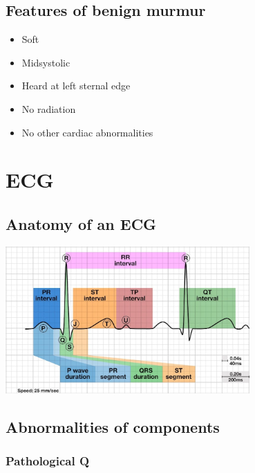 \documentclass[
  12pt,
]{memoir}
\providecommand{\tightlist}{%
  \setlength{\itemsep}{0pt}\setlength{\parskip}{0pt}}
\begin{document}
\hypertarget{features-of-benign-murmur}{%
\subsection{Features of benign murmur}\label{features-of-benign-murmur}}

\begin{itemize}
\tightlist
\item
  Soft
\item
  Midsystolic
\item
  Heard at left sternal edge
\item
  No radiation
\item
  No other cardiac abnormalities
\end{itemize}

\hypertarget{ecg}{%
\section{ECG}\label{ecg}}

\hypertarget{anatomy-of-an-ecg}{%
\subsection{Anatomy of an ECG}\label{anatomy-of-an-ecg}}

\includegraphics[width=0.7\textwidth]{../assets/med/ecg-anatomy.jpg}

\hypertarget{abnormalities-of-components}{%
\subsection{Abnormalities of
components}\label{abnormalities-of-components}}

\hypertarget{pathological-q}{%
\subsubsection{Pathological Q}\label{pathological-q}}
\end{document}
